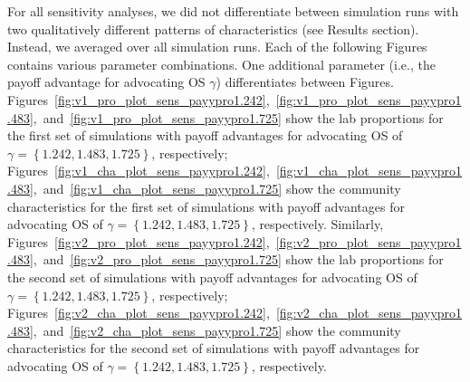 \documentclass[meta, authordate,issue]{jote-new-article}
\begin{document}
For all sensitivity analyses, we did not differentiate between simulation runs with two qualitatively different patterns of characteristics (see Results section). Instead, we averaged over all simulation runs. Each of the following Figures contains various parameter combinations. One additional parameter (i.e., the payoff advantage for advocating OS $\gamma$) differentiates between Figures. Figures~\ref{fig:v1_pro_plot_sens_payypro1.242},~\ref{fig:v1_pro_plot_sens_payypro1.483},~and~\ref{fig:v1_pro_plot_sens_payypro1.725} show the lab proportions for the first set of simulations with payoff advantages for advocating OS of $\gamma=\left\{1.242, 1.483, 1.725\right\}$, respectively; Figures~\ref{fig:v1_cha_plot_sens_payypro1.242},~\ref{fig:v1_cha_plot_sens_payypro1.483},~and~\ref{fig:v1_cha_plot_sens_payypro1.725} show the community characteristics for the first set of simulations with payoff advantages for advocating OS of $\gamma=\left\{1.242, 1.483, 1.725\right\}$, respectively. Similarly, Figures~\ref{fig:v2_pro_plot_sens_payypro1.242},~\ref{fig:v2_pro_plot_sens_payypro1.483},~and~\ref{fig:v2_pro_plot_sens_payypro1.725} show the lab proportions for the second set of simulations with payoff advantages for advocating OS of $\gamma=\left\{1.242, 1.483, 1.725\right\}$, respectively; Figures~\ref{fig:v2_cha_plot_sens_payypro1.242},~\ref{fig:v2_cha_plot_sens_payypro1.483},~and~\ref{fig:v2_cha_plot_sens_payypro1.725} show the community characteristics for the second set of simulations with payoff advantages for advocating OS of $\gamma=\left\{1.242, 1.483, 1.725\right\}$, respectively.
\end{document}
